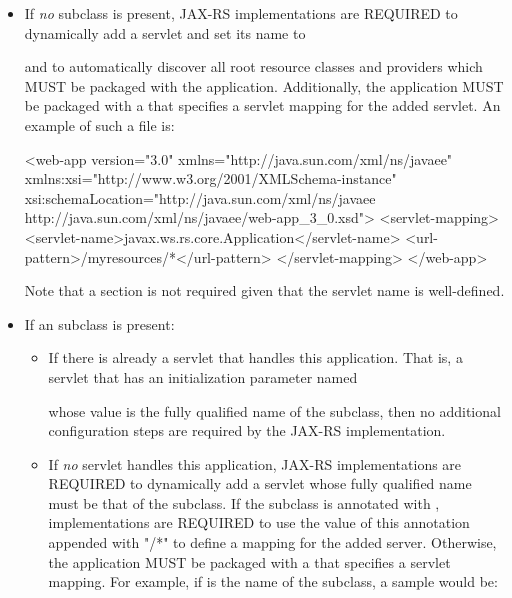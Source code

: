 \begin{itemize}
\item If {\em no}  subclass is present, JAX-RS implementations are REQUIRED to dynamically add a servlet and set its name to
\begin{quote}\end{quote} and to automatically discover all root resource classes and providers which MUST be packaged with the application. Additionally, the application MUST be packaged with a  that specifies a servlet mapping for the added servlet. An example of such a  file is:

\begin{listing}{1}
<web-app version="3.0" xmlns="http://java.sun.com/xml/ns/javaee" 
    xmlns:xsi="http://www.w3.org/2001/XMLSchema-instance" 
    xsi:schemaLocation="http://java.sun.com/xml/ns/javaee 
        http://java.sun.com/xml/ns/javaee/web-app_3_0.xsd">
    <servlet-mapping>
        <servlet-name>javax.ws.rs.core.Application</servlet-name>
        <url-pattern>/myresources/*</url-pattern>
    </servlet-mapping>
</web-app>
\end{listing} 

Note that a  section is not required given that the servlet name is well-defined.

\item If an  subclass is present:

\begin{itemize}
\item If there is already a servlet that handles this application. That is, a servlet that has an initialization parameter named
\begin{quote}\end{quote}  whose value is the fully qualified name of the  subclass, then no additional configuration steps are required by the JAX-RS implementation.

\item If {\em no} servlet handles this application, JAX-RS implementations are REQUIRED to dynamically add a servlet whose fully qualified name must be that of the  subclass. If the  subclass is annotated with \ApplicationPath, implementations are REQUIRED to use the value of this annotation appended with "/*" to define a mapping for the added server. Otherwise, the application MUST be packaged with a  that specifies a servlet mapping. For example, if  is the name of the  subclass, a sample  would be:


\end{itemize}
\end{itemize}
